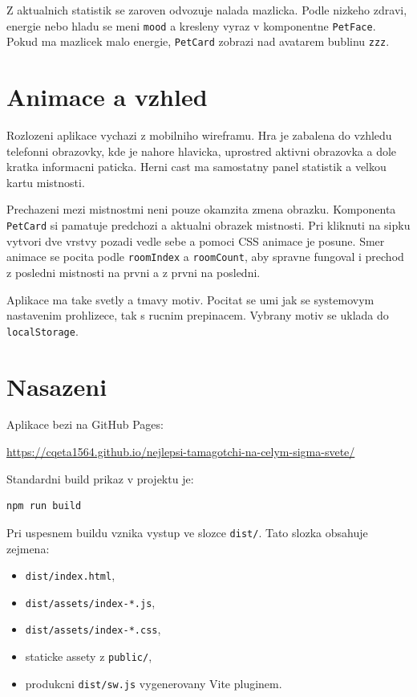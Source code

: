 \documentclass[12pt,a4paper]{article}
\begin{document}
Z aktualnich statistik se zaroven odvozuje nalada mazlicka. Podle nizkeho zdravi, energie nebo hladu se meni \texttt{mood} a kresleny vyraz v komponentne \texttt{PetFace}. Pokud ma mazlicek malo energie, \texttt{PetCard} zobrazi nad avatarem bublinu \texttt{zzz}.

\section{Animace a vzhled}

Rozlozeni aplikace vychazi z mobilniho wireframu. Hra je zabalena do vzhledu telefonni obrazovky, kde je nahore hlavicka, uprostred aktivni obrazovka a dole kratka informacni paticka. Herni cast ma samostatny panel statistik a velkou kartu mistnosti.

Prechazeni mezi mistnostmi neni pouze okamzita zmena obrazku. Komponenta \texttt{PetCard} si pamatuje predchozi a aktualni obrazek mistnosti. Pri kliknuti na sipku vytvori dve vrstvy pozadi vedle sebe a pomoci CSS animace je posune. Smer animace se pocita podle \texttt{roomIndex} a \texttt{roomCount}, aby spravne fungoval i prechod z posledni mistnosti na prvni a z prvni na posledni.

Aplikace ma take svetly a tmavy motiv. Pocitat se umi jak se systemovym nastavenim prohlizece, tak s rucnim prepinacem. Vybrany motiv se uklada do \texttt{localStorage}.

\section{Nasazeni}

Aplikace bezi na GitHub Pages:

\url{https://cqeta1564.github.io/nejlepsi-tamagotchi-na-celym-sigma-svete/}

Standardni build prikaz v projektu je:
\begin{verbatim}
npm run build
\end{verbatim}

Pri uspesnem buildu vznika vystup ve slozce \texttt{dist/}. Tato slozka obsahuje zejmena:
\begin{itemize}[leftmargin=2em]
  \item \texttt{dist/index.html},
  \item \texttt{dist/assets/index-*.js},
  \item \texttt{dist/assets/index-*.css},
  \item staticke assety z \texttt{public/},
  \item produkcni \texttt{dist/sw.js} vygenerovany Vite pluginem.
\end{itemize}
\end{document}
